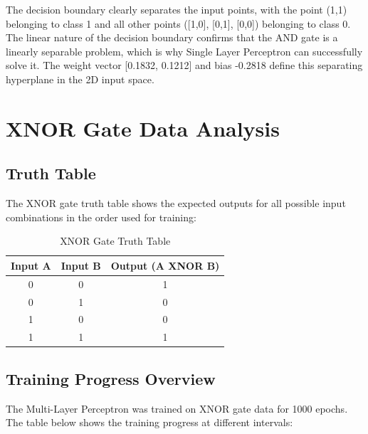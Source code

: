 \documentclass[12pt]{article}
\begin{document}
The decision boundary clearly separates the input points, with the point (1,1) belonging to class 1 and all other points ([1,0], [0,1], [0,0]) belonging to class 0. The linear nature of the decision boundary confirms that the AND gate is a linearly separable problem, which is why Single Layer Perceptron can successfully solve it. The weight vector [0.1832, 0.1212] and bias -0.2818 define this separating hyperplane in the 2D input space.


\section*{XNOR Gate Data Analysis}

\subsection*{Truth Table}
The XNOR gate truth table shows the expected outputs for all possible input combinations in the order used for training:

\begin{table}[H]
\centering
\caption{XNOR Gate Truth Table}
\renewcommand{\arraystretch}{1.5}
\begin{tabular}{|c|c|c|}
\hline
\textbf{Input A} & \textbf{Input B} & \textbf{Output (A XNOR B)} \\
\hline
0 & 0 & 1 \\
\hline
0 & 1 & 0 \\
\hline
1 & 0 & 0 \\
\hline
1 & 1 & 1 \\
\hline
\end{tabular}
\end{table}

\subsection*{Training Progress Overview}
The Multi-Layer Perceptron was trained on XNOR gate data for 1000 epochs. The table below shows the training progress at different intervals:
\end{document}
